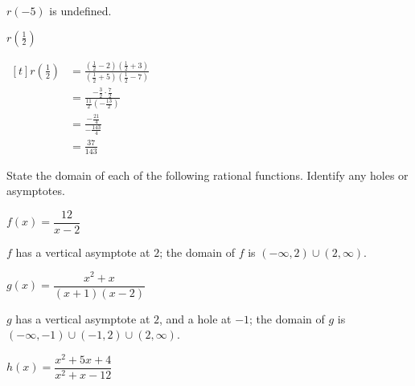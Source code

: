 \begin{exercises}
\begin{problem}
\begin{multicols}{4}
\begin{subproblem}
\begin{shortsolution}
 				$r(-5)$ is undefined.
 			\end{shortsolution}
 		\end{subproblem}
 		\begin{subproblem}
 			$r\left( \frac{1}{2} \right)$
 			\begin{shortsolution}
 				$\begin{aligned}[t]
 					r\left( \frac{1}{2} \right) & = \frac{\left( \frac{1}{2}-2 \right)\left( \frac{1}{2}+3 \right)}{\left( \frac{1}{2}+5 \right)\left( \frac{1}{2}-7 \right)} \\
 					                            & =\frac{-\frac{3}{2}\cdot\frac{7}{2}}{\frac{11}{2}\left( -\frac{13}{2} \right)}                                              \\
 					                            & =\frac{-\frac{21}{4}}{-\frac{143}{4}}                                                                                       \\
 					                            & =\frac{37}{143}
 				\end{aligned}$
 			\end{shortsolution}
 		\end{subproblem}
 	\end{multicols}
 	\end{problem}
 	\begin{problem}
 	State the domain of each of the following rational functions. Identify
 	any holes or asymptotes.
 	\begin{multicols}{3}
 		\begin{subproblem}
 			$f(x)=\dfrac{12}{x-2}$
 			\begin{shortsolution}
 				$f$ has a vertical asymptote at $2$; the domain of $f$ is $(-\infty,2)\cup (2,\infty)$.
 			\end{shortsolution}
 		\end{subproblem}
 		\begin{subproblem}
 			$g(x)=\dfrac{x^2+x}{(x+1)(x-2)}$
 			\begin{shortsolution}
 				$g$ has a vertical asymptote at $2$, and a hole at $-1$; the domain of $g$ is $(-\infty,-1)\cup(-1,2)\cup(2,\infty)$.
 			\end{shortsolution}
 		\end{subproblem}
 		\begin{subproblem}
 			$h(x)=\dfrac{x^2+5x+4}{x^2+x-12}$
 			\begin{shortsolution}

\end{shortsolution}
\end{subproblem}
\end{multicols}
\end{problem}
\end{exercises}
